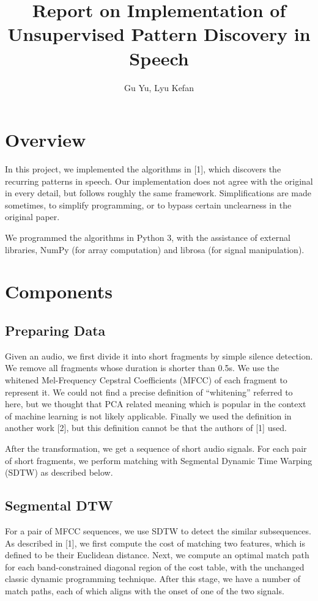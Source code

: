 \documentclass{article}
\title{Report on Implementation of Unsupervised Pattern Discovery in Speech}
\author{Gu Yu, Lyu Kefan}
\begin{document}
\maketitle

\section{Overview}
    In this project, we implemented the algorithms in [1], which discovers the recurring patterns
    in speech. Our implementation does not agree with the original in every detail, but follows 
    roughly the same framework. Simplifications are made sometimes, to simplify programming, or to bypass
    certain unclearness in the original paper.

    We programmed the algorithms in Python 3, with the assistance of external libraries, NumPy 
    (for array computation) and librosa (for signal manipulation).

\section{Components}
    \subsection{Preparing Data}
        Given an audio, we first divide it into short fragments by simple silence detection. We 
        remove all fragments whose duration is shorter than 0.5s. We use the whitened
        Mel-Frequency Cepstral Coefficients (MFCC) of each fragment to represent it.
        We could not find a precise definition of ``whitening'' referred to here, but we thought that
        PCA related meaning which is popular in the context of machine learning is not likely applicable.
        Finally we used the definition in another work [2], but this definition cannot be that the 
        authors of [1] used.   
        
        After the transformation, we get a sequence of short audio signals. For each pair of 
        short fragments, we perform matching with Segmental Dynamic Time Warping (SDTW) as described below.

    \subsection{Segmental DTW}
        For a pair of MFCC sequences, we use SDTW to detect the similar subsequences. As described in [1],
        we first compute the cost of matching two features, which is defined to be their Euclidean distance.
        Next, we compute an optimal match path for each band-constrained diagonal region of the cost table, 
        with the unchanged classic dynamic programming technique. After this stage, we have a number of 
        match paths, each of which aligns with the onset of one of the two signals.
\end{document}
